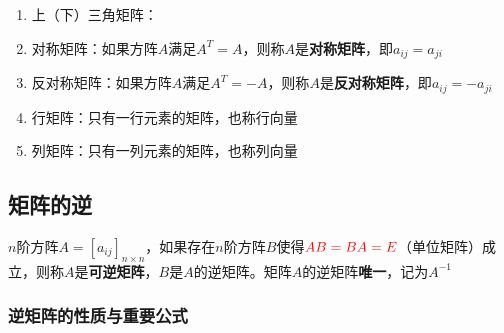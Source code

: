 \documentclass[./linear_algebra.tex]{subfiles}
\begin{document}
\begin{enumerate}
\begin{itemize}
\[\begin{bmatrix}
                    a_1 &     &     \\
                    & a_2 &     \\
                    &     & a_3
                \end{bmatrix}^{-1}
                = \begin{bmatrix}
                      \dfrac{1}{a_{1}} &                 &                 \\
                      & \dfrac{1}{a_{2}} &                 \\
                      &                 & \dfrac{1}{a_{3}}
                \end{bmatrix}
            \]
        \end{itemize}
        \item 上（下）三角矩阵：
        \item 对称矩阵：如果方阵$A$满足$A^T = A$，则称$A$是\textbf{对称矩阵}，即$a_{ij} = a_{ji}$
        \item 反对称矩阵：如果方阵$A$满足$A^T = -A$，则称$A$是\textbf{反对称矩阵}，即$a_{ij} = -a_{ji}$
        \item 行矩阵：只有一行元素的矩阵，也称行向量
        \item 列矩阵：只有一列元素的矩阵，也称列向量
    \end{enumerate}

    \subsection{矩阵的逆}

    $n$阶方阵$A = [a_{ij}]_{n \times n}$，如果存在$n$阶方阵$B$使得${\color{red}{AB = BA = E}}$（单位矩阵）成立，则称$A$是\textbf{可逆矩阵}，$B$是$A$的逆矩阵。矩阵$A$的逆矩阵\textbf{唯一}，记为$A^{-1}$

    \subsubsection{逆矩阵的性质与重要公式}
\end{document}
